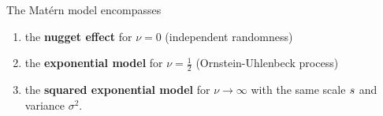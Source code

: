 
\begin{remark}
	The Matérn model encompasses
	\begin{enumerate}
		\item the \textbf{nugget effect} for \(\nu=0\) (independent randomness)
		\item the \textbf{exponential model} for \(\nu=\tfrac12\) (Ornstein-Uhlenbeck process)
		\item the \textbf{squared exponential model} for \(\nu\to \infty\) with the same
		scale \(s\) and variance \(\sigma^2\).
	\end{enumerate}
\end{remark}
